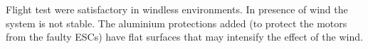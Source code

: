 \documentclass[conference]{IEEEtran}
\begin{document}
Flight test were satisfactory in windless environments. In presence of wind the system is not stable. The aluminium protections added (to protect the motors from the faulty ESCs) have flat surfaces that may intensify the effect of the wind.

%
%



%
%
\end{document}
